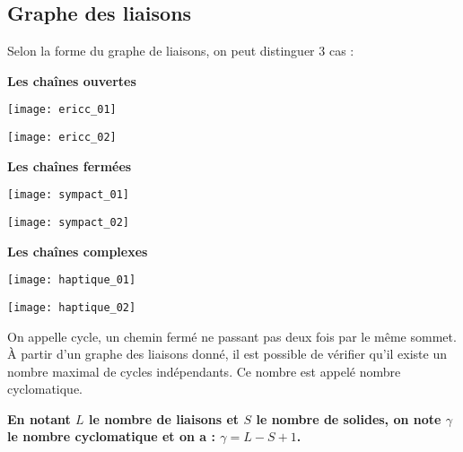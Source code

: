 \subsection{Graphe des liaisons}

\begin{defi}
Selon la forme du graphe de liaisons, on peut distinguer 3 cas :
\begin{multicols}{3}
\begin{center}
\textbf{Les chaînes ouvertes} 
\end{center}

\begin{center}
\texttt{[image: ericc\_01]}

\vspace{.5cm}

\texttt{[image: ericc\_02]}
\end{center}

\vspace{.5cm}

\begin{center}
\textbf{Les chaînes fermées} 
\end{center}

\begin{center}
\texttt{[image: sympact\_01]}

\vspace{.5cm}

\texttt{[image: sympact\_02]}
\end{center}

\vfill\null
\columnbreak

\begin{center}
\textbf{Les chaînes complexes} 
\end{center}

\begin{center}
\texttt{[image: haptique\_01]}

\vspace{.5cm}

\texttt{[image: haptique\_02]}
\end{center}

\end{multicols}

On appelle cycle, un chemin fermé ne passant pas deux fois par le même sommet.
À partir d’un graphe des liaisons donné, il est possible de vérifier qu’il existe un nombre
maximal de cycles indépendants. Ce nombre est appelé nombre cyclomatique. 

\textbf{En notant $L$ le nombre de liaisons et $S$ le nombre de solides, on note $\gamma$ le nombre cyclomatique et on a : $\gamma = L - S + 1$.}
\end{defi}

